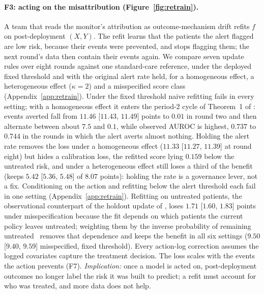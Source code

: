\documentclass[letterpaper]{article} %
\begin{document}
\paragraph{F3: acting on the misattribution (Figure~\ref{fig:retrain}).}
A team that reads the monitor's attribution as outcome-mechanism drift refits
$f$ on post-deployment $(X, Y)$. The refit learns that the patients the alert
flagged are low risk, because their events were prevented, and stops flagging
them; the next round's data then contain their events again. We compare seven update rules over eight rounds against one
standard-care reference, under the deployed fixed threshold and with the
original alert rate held, for a homogeneous effect, a heterogeneous effect
($\kappa = 2$) and a misspecified score class (Appendix~\ref{app:retrain}).
Under the fixed threshold naive refitting fails in every setting; with a
homogeneous effect it enters the period-2 cycle of Theorem~1 of
\citet{liley2021model}: events averted fall from $11.46$ [$11.43$, $11.49$]
points to $0.01$ in round two and then alternate between about $7.5$ and
$0.1$, while observed AUROC is highest, $0.737$ to $0.744$ in the rounds in which
the alert averts almost nothing. Holding the alert rate removes the
loss under a homogeneous effect ($11.33$ [$11.27$, $11.39$] at round eight)
but hides a calibration loss, the refitted score lying $0.159$ below the
untreated risk, and under a heterogeneous effect still loses a third of the
benefit (keeps $5.42$ [$5.36$, $5.48$] of $8.07$ points): holding the rate is a governance lever, not a fix.
Conditioning on the action and refitting below the alert threshold each
fail in one setting (Appendix~\ref{app:retrain}). Refitting on untreated
patients, the observational counterpart of the holdout update of
\citet{liley2021model}, loses $1.71$ [$1.60$, $1.83$] points under
misspecification because the fit depends on which patients the current policy
leaves untreated; weighting them by the inverse probability of remaining
untreated~\citep{sperrin2018msm} removes that dependence and keeps the benefit
in all six settings ($9.50$ [$9.40$, $9.59$] misspecified, fixed threshold).
Every action-log correction assumes the logged covariates capture the
treatment decision. The loss scales with the events the action prevents
(F7). \emph{Implication:} once a model is acted on, post-deployment outcomes
no longer label the risk it was built to predict; a refit must account for
who was treated, and more data does not help.





\end{document}
